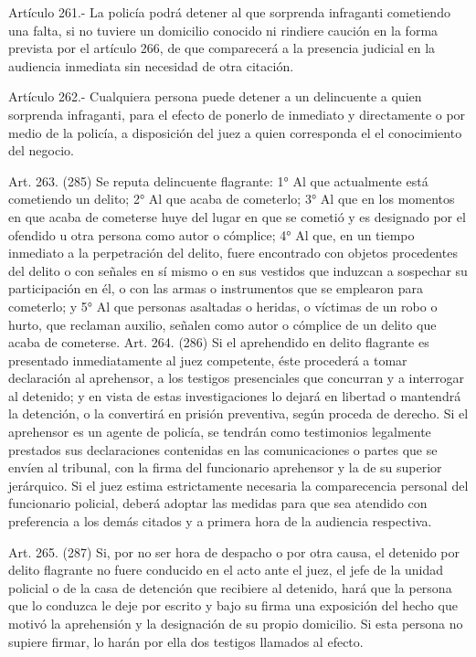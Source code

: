     Artículo 261.- La policía podrá detener al que sorprenda infraganti cometiendo una falta, si no tuviere un domicilio conocido ni rindiere caución en la forma prevista por el artículo 266, de que comparecerá a la presencia judicial en la audiencia inmediata sin necesidad de otra citación.

    Artículo 262.- Cualquiera persona puede detener a un delincuente a quien sorprenda infraganti, para el efecto de ponerlo de inmediato y directamente o por medio de la policía, a disposición del juez a quien corresponda el el conocimiento del negocio.

    Art. 263. (285) Se reputa delincuente flagrante:
    1° Al que actualmente está cometiendo un delito;
    2° Al que acaba de cometerlo;
    3° Al que en los momentos en que acaba de cometerse huye del lugar en que se cometió y es designado por el ofendido u otra persona como autor o cómplice;
    4° Al que, en un tiempo inmediato a la perpetración del delito, fuere encontrado con objetos procedentes del delito o con señales en sí mismo o en sus vestidos que induzcan a sospechar su participación en él, o con las armas o instrumentos que se emplearon para cometerlo; y
    5° Al que personas asaltadas o heridas, o víctimas de un robo o hurto, que reclaman auxilio, señalen como autor o cómplice de un delito que acaba de cometerse.
    Art. 264. (286) Si el aprehendido en delito flagrante es presentado inmediatamente al juez competente, éste procederá a tomar declaración al aprehensor, a los testigos presenciales que concurran y a interrogar al detenido; y en vista de estas investigaciones lo dejará en libertad o mantendrá la detención, o la convertirá en prisión preventiva, según proceda de derecho.
    Si el aprehensor es un agente de policía, se tendrán como testimonios legalmente prestados sus declaraciones contenidas en las comunicaciones o partes que se envíen al tribunal, con la firma del funcionario aprehensor y la de su superior jerárquico. Si el juez estima estrictamente necesaria la comparecencia personal del funcionario policial, deberá adoptar las medidas para que sea atendido con preferencia a los demás citados y a primera hora de la audiencia respectiva.

    Art. 265. (287) Si, por no ser hora de despacho o por otra causa, el detenido por delito flagrante no fuere conducido en el acto ante el juez, el jefe de la unidad policial o de la casa de detención que recibiere al detenido, hará que la persona que lo conduzca le deje por escrito y bajo su firma una exposición del hecho que motivó la aprehensión  y la designación de su propio domicilio.
    Si esta persona no supiere firmar, lo harán por ella dos testigos llamados al efecto.

